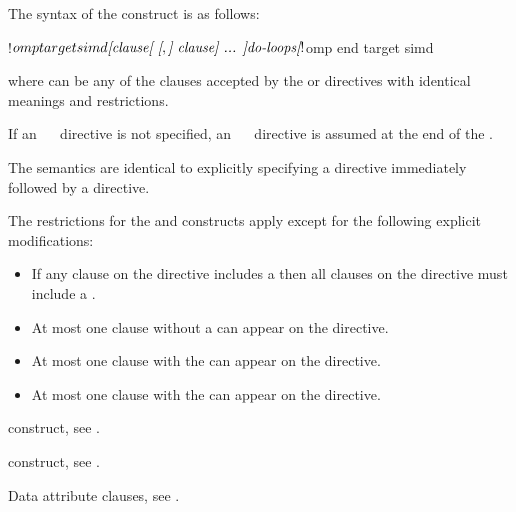 \begin{fortranspecific}
The syntax of the   construct is as follows:

\begin{ompfPragma}
!$omp target simd \plc{[clause[ [},\plc{] clause] ... ]}
    \plc{do-loops}
\plc{[}!$omp end target simd\plc{]}
\end{ompfPragma}

where  can be any of the clauses accepted by the  or
 directives with identical meanings and restrictions.

If an ~~ directive is not specified, an
~~ directive is assumed at the end of
the .
\end{fortranspecific}

\descr
The semantics are identical to explicitly specifying a  directive
immediately followed by a  directive.

\restrictions

The restrictions for the  and  constructs apply
except for the following explicit modifications:

\begin{itemize}
\item If any  clause on the directive includes a
       then all  clauses
      on the directive must include a .
\item At most one  clause without a
       can appear on the directive.
\item At most one  clause with the 
       can appear on the directive.
\item At most one  clause with the 
       can appear on the directive.
\end{itemize}

\begin{crossrefs}
\item {} construct, see
.

\item {} construct, see
.

\item Data attribute clauses, see
.
\end{crossrefs}



